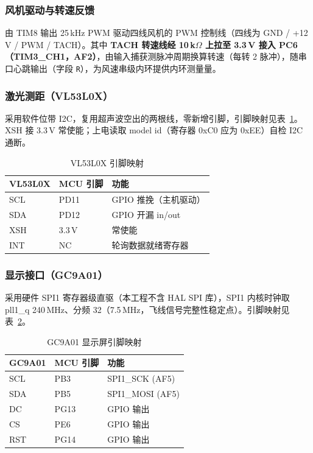 \documentclass[12pt,a4paper]{ctexart}
\begin{document}
\subsubsection{风机驱动与转速反馈}
由 TIM8 输出 25\,kHz PWM 驱动四线风机的 PWM 控制线（四线为 GND / +12\,V / PWM / TACH）。其中 \textbf{TACH 转速线经 10\,k$\Omega$ 上拉至 3.3\,V 接入 PC6（TIM3\_CH1，AF2）}，由输入捕获测脉冲周期换算转速（每转 2 脉冲），随串口心跳输出（字段 \texttt{R}），为风速串级内环提供内环测量量。

\subsubsection{激光测距（VL53L0X）}
采用软件位带 I2C，复用超声波空出的两根线，零新增引脚，引脚映射见表~\ref{tab:tof}。XSH 接 3.3\,V 常使能；上电读取 model id（寄存器 0xC0 应为 0xEE）自检 I2C 通断。

\begin{table}[H]
\centering
\caption{VL53L0X 引脚映射}
\label{tab:tof}
\begin{tabular}{lll}
\toprule
VL53L0X & MCU 引脚 & 功能 \\
\midrule
SCL & PD11 & GPIO 推挽（主机驱动） \\
SDA & PD12 & GPIO 开漏 in/out \\
XSH & 3.3\,V & 常使能 \\
INT & NC & 轮询数据就绪寄存器 \\
\bottomrule
\end{tabular}
\end{table}

\subsubsection{显示接口（GC9A01）}
采用硬件 SPI1 寄存器级直驱（本工程不含 HAL SPI 库），SPI1 内核时钟取 pll1\_q 240\,MHz、分频 32（7.5\,MHz，飞线信号完整性稳定点）。引脚映射见表~\ref{tab:pin}。

\begin{table}[H]
\centering
\caption{GC9A01 显示屏引脚映射}
\label{tab:pin}
\begin{tabular}{lll}
\toprule
GC9A01 & MCU 引脚 & 功能 \\
\midrule
SCL & PB3  & SPI1\_SCK (AF5) \\
SDA & PB5  & SPI1\_MOSI (AF5) \\
DC  & PG13 & GPIO 输出 \\
CS  & PE6  & GPIO 输出 \\
RST & PG14 & GPIO 输出 \\
\bottomrule
\end{tabular}
\end{table}
\end{document}
